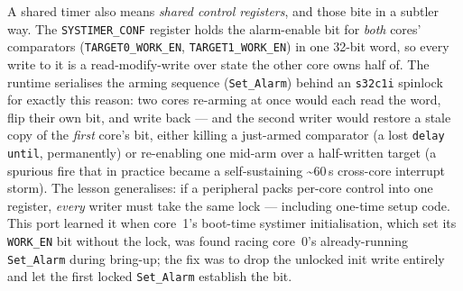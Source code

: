 A shared timer also means \emph{shared control registers}, and those bite in a
subtler way. The \texttt{SYSTIMER\_CONF} register holds the alarm-enable bit for
\emph{both} cores' comparators (\texttt{TARGET0\_WORK\_EN}, \texttt{TARGET1\_WORK\_EN})
in one 32-bit word, so every write to it is a read-modify-write over state the
other core owns half of. The runtime serialises the arming sequence
(\texttt{Set\_Alarm}) behind an \texttt{s32c1i} spinlock for exactly this reason:
two cores re-arming at once would each read the word, flip their own bit, and
write back --- and the second writer would restore a stale copy of the
\emph{first} core's bit, either killing a just-armed comparator (a lost
\texttt{delay until}, permanently) or re-enabling one mid-arm over a half-written
target (a spurious fire that in practice became a self-sustaining
\textasciitilde60\,\textmu s cross-core interrupt storm). The lesson generalises:
if a peripheral packs per-core control into one register, \emph{every} writer must
take the same lock --- including one-time setup code. This port learned it when
core~1's boot-time systimer initialisation, which set its \texttt{WORK\_EN} bit
without the lock, was found racing core~0's already-running \texttt{Set\_Alarm}
during bring-up; the fix was to drop the unlocked init write entirely and let the
first locked \texttt{Set\_Alarm} establish the bit.

